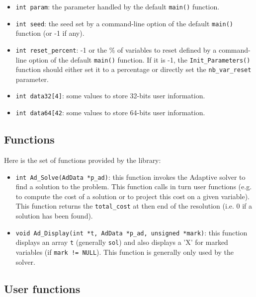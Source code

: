 \documentclass{article}
\begin{document}
\begin{itemize}

\item \texttt{int param}: the parameter handled by the default \texttt{main()} function.

\item \texttt{int seed}: the seed set by a command-line option of the default \texttt{main()}
  function (or -1 if any). 

\item \texttt{int reset\_percent}: -1 or the \% of variables to reset defined
  by a command-line option of the default \texttt{main()} function.  If it is
  -1, the \texttt{Init\_Parameters()} function should either set it to a
  percentage or directly set the \texttt{nb\_var\_reset} parameter.
 
\item \texttt{int data32[4]}: some values to store 32-bits user information.

\item \texttt{int data64[42}: some values to store 64-bits user information.

\end{itemize}


\subsection{Functions}

Here is the set of functions provided by the library:

\begin{itemize}

\item \texttt{int Ad\_Solve(AdData *p\_ad)}: this function invokes the Adaptive solver
 to find a solution to the problem. This function calls in turn user
 functions (e.g. to compute the cost of a solution or to project this cost on
 a given variable). This function returns the \texttt{total\_cost} at
 then end of the resolution (i.e. 0 if a solution has been found).

\item \texttt{void Ad\_Display(int *t, AdData *p\_ad, unsigned *mark)}: this function displays
 an array \texttt{t} (generally \texttt{sol}) and also displays a 'X' for
 marked variables (if \texttt{mark != NULL}). This function is generally only 
 used by the solver.

\end{itemize}


\subsection{User functions}
\end{document}
